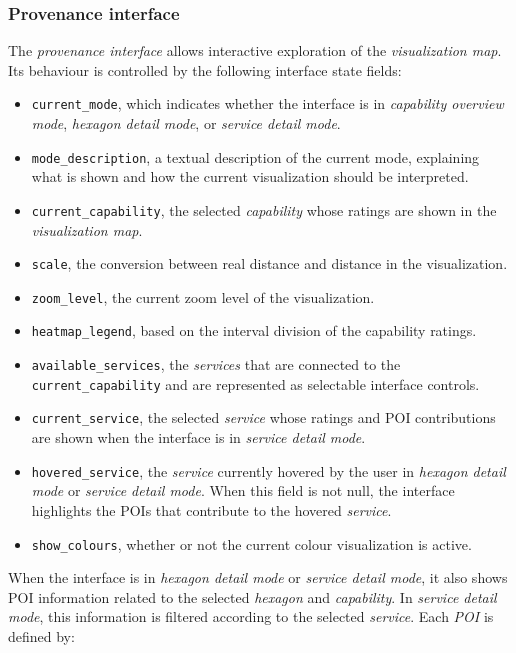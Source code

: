 \documentclass{article}
\begin{document}
\subsubsection*{Provenance interface}
The \emph{provenance interface} allows interactive exploration of the \emph{visualization map}. Its behaviour is controlled by the following interface state fields:
\begin{itemize}
    \item \texttt{current\_mode}, which indicates whether the interface is in \emph{capability overview mode}, \emph{hexagon detail mode}, or \emph{service detail mode}.
    \item \texttt{mode\_description}, a textual description of the current mode, explaining what is shown and how the current visualization should be interpreted.
    \item \texttt{current\_capability}, the selected \emph{capability} whose ratings are shown in the \emph{visualization map}.
    \item \texttt{scale}, the conversion between real distance and distance in the visualization.
    \item \texttt{zoom\_level}, the current zoom level of the visualization.
    \item \texttt{heatmap\_legend}, based on the interval division of the capability ratings.
    \item \texttt{available\_services}, the \emph{services} that are connected to the \texttt{current\_capability} and are represented as selectable interface controls.
    \item \texttt{current\_service}, the selected \emph{service} whose ratings and POI contributions are shown when the interface is in \emph{service detail mode}.
    \item \texttt{hovered\_service}, the \emph{service} currently hovered by the user in \emph{hexagon detail mode} or \emph{service detail mode}. When this field is not null, the interface highlights the POIs that contribute to the hovered \emph{service}.
    \item \texttt{show\_colours}, whether or not the current colour visualization is active.
\end{itemize}
When the interface is in \emph{hexagon detail mode} or \emph{service detail mode}, it also shows POI information related to the selected \emph{hexagon} and \emph{capability}. In \emph{service detail mode}, this information is filtered according to the selected \emph{service}. Each \emph{POI} is defined by:
\end{document}
